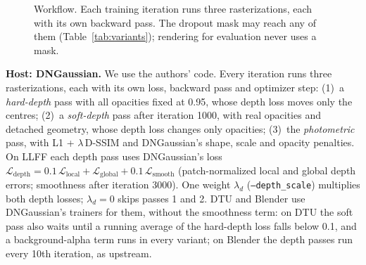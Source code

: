 \documentclass[conference]{IEEEtran}
\begin{document}
\begin{figure}[t]
\centering
{}
\caption{Workflow. Each training iteration runs three rasterizations, each with its own backward pass. The dropout mask may reach any of them (Table~\ref{tab:variants}); rendering for evaluation never uses a mask.}
\label{fig:workflow}
\end{figure}

\textbf{Host: DNGaussian.} We use the authors' code. Every iteration runs three rasterizations, each with its own loss, backward pass and optimizer step: (1)~a \emph{hard-depth} pass with all opacities fixed at 0.95, whose depth loss moves only the centres; (2)~a \emph{soft-depth} pass after iteration 1000, with real opacities and detached geometry, whose depth loss changes only opacities; (3)~the \emph{photometric} pass, with L1 + $\lambda$\,D-SSIM and DNGaussian's shape, scale and opacity penalties. On LLFF each depth pass uses DNGaussian's loss $\mathcal L_{\text{depth}}=0.1\,\mathcal L_{\text{local}}+\mathcal L_{\text{global}}+0.1\,\mathcal L_{\text{smooth}}$ (patch-normalized local and global depth errors; smoothness after iteration 3000). One weight $\lambda_d$ (\texttt{--depth\_scale}) multiplies both depth losses; $\lambda_d=0$ skips passes 1 and 2. DTU and Blender use DNGaussian's trainers for them, without the smoothness term: on DTU the soft pass also waits until a running average of the hard-depth loss falls below 0.1, and a background-alpha term runs in every variant; on Blender the depth passes run every 10th iteration, as upstream.
\end{document}
